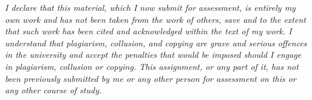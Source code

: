 \documentclass{article}
\begin{document}
\newpage

\printbibliography

\newpage

\noindent \textit{I declare that this material, which I now submit for assessment, is entirely my own work and has not been taken from the work of others, save and to the extent that such work has been cited and acknowledged within the text of my work. I understand that plagiarism, collusion, and copying are grave and serious offences in the university and accept the penalties that would be imposed should I engage in plagiarism, collusion or copying. This assignment, or any part of it, has not been previously submitted by me or any other person for assessment on this or any other course of study.}
\end{document}
